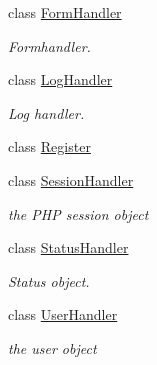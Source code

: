 \begin{DoxyCompactItemize}
class \hyperlink{classFormHandler}{FormHandler}
\begin{DoxyCompactList}\small\item\em Formhandler. \item\end{DoxyCompactList}\item 
class \hyperlink{classLogHandler}{LogHandler}
\begin{DoxyCompactList}\small\item\em Log handler. \item\end{DoxyCompactList}\item 
class \hyperlink{classRegister}{Register}
\item 
class \hyperlink{classSessionHandler}{SessionHandler}
\begin{DoxyCompactList}\small\item\em the PHP session object \item\end{DoxyCompactList}\item 
class \hyperlink{classStatusHandler}{StatusHandler}
\begin{DoxyCompactList}\small\item\em Status object. \item\end{DoxyCompactList}\item 
class \hyperlink{classUserHandler}{UserHandler}
\begin{DoxyCompactList}\small\item\em the user object \item\end{DoxyCompactList}\end{DoxyCompactItemize}
